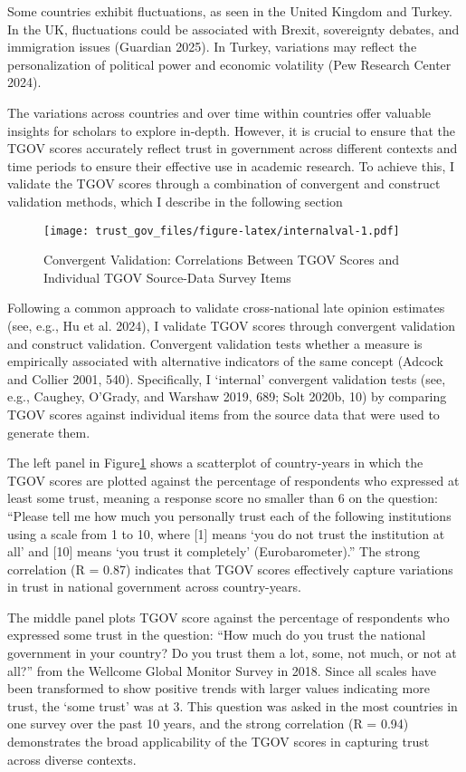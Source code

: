\documentclass[
  12pt,
]{article}
\begin{document}
Some countries exhibit fluctuations, as seen in the United Kingdom and Turkey.
In the UK, fluctuations could be associated with Brexit, sovereignty debates, and immigration issues (Guardian 2025).
In Turkey, variations may reflect the personalization of political power and economic volatility (Pew Research Center 2024).

The variations across countries and over time within countries offer valuable insights for scholars to explore in-depth.
However, it is crucial to ensure that the TGOV scores accurately reflect trust in government across different contexts and time periods to ensure their effective use in academic research.
To achieve this, I validate the TGOV scores through a combination of convergent and construct validation methods, which I describe in the following section

\begin{figure}
\centering
\texttt{[image: trust\_gov\_files/figure-latex/internalval-1.pdf]}
\caption{\label{fig:internalval}Convergent Validation: Correlations Between TGOV Scores and Individual TGOV Source-Data Survey Items \label{internal_val}}
\end{figure}

Following a common approach to validate cross-national late opinion estimates (see, e.g., Hu et al. 2024), I validate TGOV scores through convergent validation and construct validation.
Convergent validation tests whether a measure is empirically associated with alternative indicators of the same concept (Adcock and Collier 2001, 540).
Specifically, I `internal' convergent validation tests (see, e.g., Caughey, O'Grady, and Warshaw 2019, 689; Solt 2020b, 10) by comparing TGOV scores against individual items from the source data that were used to generate them.

The left panel in Figure\nobreakspace{}\ref{internal_val} shows a scatterplot of country-years in which the TGOV scores are plotted against the percentage of respondents who expressed at least some trust, meaning a response score no smaller than 6 on the question: ``Please tell me how much you personally trust each of the following institutions using a scale from 1 to 10, where {[}1{]} means `you do not trust the institution at all' and {[}10{]} means `you trust it completely' (Eurobarometer).''
The strong correlation (R = 0.87) indicates that TGOV scores effectively capture variations in trust in national government across country-years.

The middle panel plots TGOV score against the percentage of respondents who expressed some trust in the question: ``How much do you trust the national government in your country? Do you trust them a lot, some, not much, or not at all?'' from the Wellcome Global Monitor Survey in 2018.
Since all scales have been transformed to show positive trends with larger values indicating more trust, the `some trust' was at 3.
This question was asked in the most countries in one survey over the past 10 years, and the strong correlation (R = 0.94) demonstrates the broad applicability of the TGOV scores in capturing trust across diverse contexts.
\end{document}
